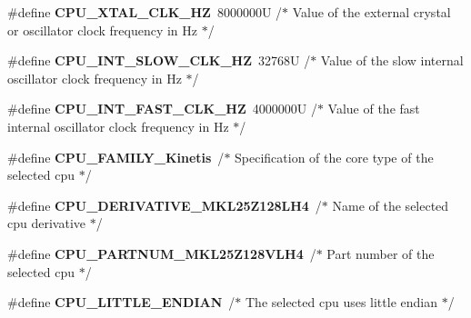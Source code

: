 \begin{DoxyCompactItemize}
\item 
\hypertarget{group___cpu__module_gacf80ae1c70da6f1932185345fb089ce2}{\#define {\bfseries C\-P\-U\-\_\-\-X\-T\-A\-L\-\_\-\-C\-L\-K\-\_\-\-H\-Z}~8000000\-U /$\ast$ Value of the external crystal or oscillator clock frequency in Hz $\ast$/}\label{group___cpu__module_gacf80ae1c70da6f1932185345fb089ce2}

\item 
\hypertarget{group___cpu__module_ga925e4835a9fdb52f03bd354d62d6ba0a}{\#define {\bfseries C\-P\-U\-\_\-\-I\-N\-T\-\_\-\-S\-L\-O\-W\-\_\-\-C\-L\-K\-\_\-\-H\-Z}~32768\-U /$\ast$ Value of the slow internal oscillator clock frequency in Hz  $\ast$/}\label{group___cpu__module_ga925e4835a9fdb52f03bd354d62d6ba0a}

\item 
\hypertarget{group___cpu__module_ga741ad9275688de8051f4bebd98a682bc}{\#define {\bfseries C\-P\-U\-\_\-\-I\-N\-T\-\_\-\-F\-A\-S\-T\-\_\-\-C\-L\-K\-\_\-\-H\-Z}~4000000\-U /$\ast$ Value of the fast internal oscillator clock frequency in Hz  $\ast$/}\label{group___cpu__module_ga741ad9275688de8051f4bebd98a682bc}

\item 
\hypertarget{group___cpu__module_ga5bf3022570d9bb7a0d666f2dd9db6a34}{\#define {\bfseries C\-P\-U\-\_\-\-F\-A\-M\-I\-L\-Y\-\_\-\-Kinetis}~/$\ast$ Specification of the core type of the selected cpu $\ast$/}\label{group___cpu__module_ga5bf3022570d9bb7a0d666f2dd9db6a34}

\item 
\hypertarget{group___cpu__module_ga79cde38c714e161a62843763a97857ca}{\#define {\bfseries C\-P\-U\-\_\-\-D\-E\-R\-I\-V\-A\-T\-I\-V\-E\-\_\-\-M\-K\-L25\-Z128\-L\-H4}~/$\ast$ Name of the selected cpu derivative $\ast$/}\label{group___cpu__module_ga79cde38c714e161a62843763a97857ca}

\item 
\hypertarget{group___cpu__module_gaa7461a2be876b8ec129f8508ade50a3d}{\#define {\bfseries C\-P\-U\-\_\-\-P\-A\-R\-T\-N\-U\-M\-\_\-\-M\-K\-L25\-Z128\-V\-L\-H4}~/$\ast$ Part number of the selected cpu $\ast$/}\label{group___cpu__module_gaa7461a2be876b8ec129f8508ade50a3d}

\item 
\hypertarget{group___cpu__module_gab62ca27d0a6a531f35842a6e3a94b454}{\#define {\bfseries C\-P\-U\-\_\-\-L\-I\-T\-T\-L\-E\-\_\-\-E\-N\-D\-I\-A\-N}~/$\ast$ The selected cpu uses little endian $\ast$/}\label{group___cpu__module_gab62ca27d0a6a531f35842a6e3a94b454}


\end{DoxyCompactItemize}
